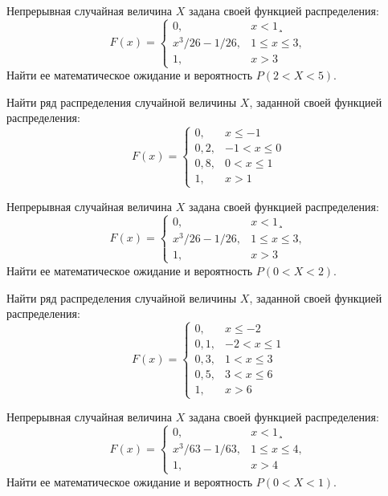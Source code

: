 \vfill

\z Непрерывная случайная величина $X$ задана своей функцией распределения: $$ F(x) = \begin{cases}0, & x < 1¸\\ x^3/26-1/26, & 1 \leqslant x \leqslant 3, \\ 1, & x > 3 \end{cases} $$ Найти ее математическое ожидание и вероятность $P(2 < X < 5)$.
 

\vfill

\newpage\setcounter{zad}{0}

\z Найти ряд распределения случайной величины $X$, заданной своей функцией распределения: $$ F(x) = \begin{cases}0, & x \leqslant -1 \\ 0{,}2, & -1 < x \leqslant 0 \\ 0{,}8, & 0 < x \leqslant 1 \\ 1, & x > 1 \end{cases} $$


\vfill

\z Непрерывная случайная величина $X$ задана своей функцией распределения: $$ F(x) = \begin{cases}0, & x < 1¸\\ x^3/26-1/26, & 1 \leqslant x \leqslant 3, \\ 1, & x > 3 \end{cases} $$ Найти ее математическое ожидание и вероятность $P(0 < X < 2)$.
 

\vfill

\newpage\setcounter{zad}{0}

\z Найти ряд распределения случайной величины $X$, заданной своей функцией распределения: $$ F(x) = \begin{cases}0, & x \leqslant -2 \\ 0{,}1, & -2 < x \leqslant 1 \\ 0{,}3, & 1 < x \leqslant 3 \\ 0{,}5, & 3 < x \leqslant 6 \\ 1, & x > 6 \end{cases} $$


\vfill

\z Непрерывная случайная величина $X$ задана своей функцией распределения: $$ F(x) = \begin{cases}0, & x < 1¸\\ x^3/63-1/63, & 1 \leqslant x \leqslant 4, \\ 1, & x > 4 \end{cases} $$ Найти ее математическое ожидание и вероятность $P(0 < X < 1)$.
 

